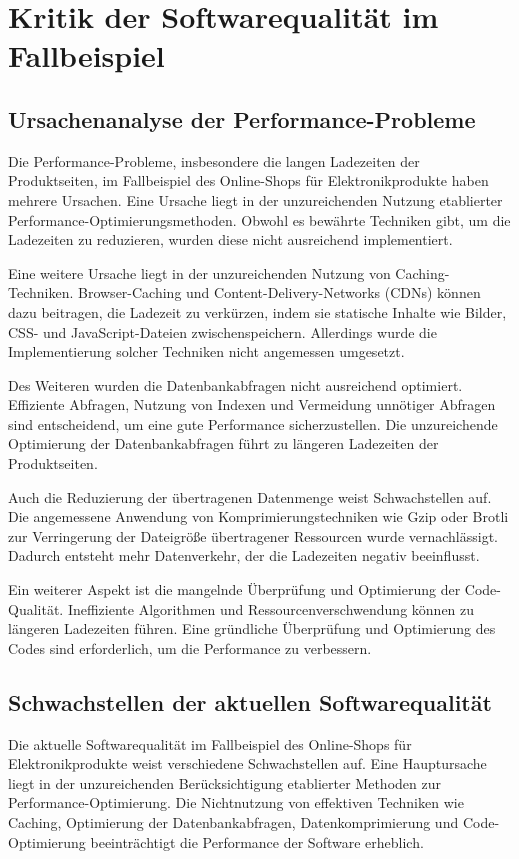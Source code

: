 \section{Kritik der Softwarequalität im Fallbeispiel}

\subsection{Ursachenanalyse der Performance-Probleme}
Die Performance-Probleme, insbesondere die langen Ladezeiten der Produktseiten, im Fallbeispiel des Online-Shops für Elektronikprodukte haben mehrere Ursachen. Eine Ursache liegt in der unzureichenden Nutzung etablierter Performance-Optimierungsmethoden. Obwohl es bewährte Techniken gibt, um die Ladezeiten zu reduzieren, wurden diese nicht ausreichend implementiert.

Eine weitere Ursache liegt in der unzureichenden Nutzung von Caching-Techniken. Browser-Caching und Content-Delivery-Networks (CDNs) können dazu beitragen, die Ladezeit zu verkürzen, indem sie statische Inhalte wie Bilder, CSS- und JavaScript-Dateien zwischenspeichern. Allerdings wurde die Implementierung solcher Techniken nicht angemessen umgesetzt.

Des Weiteren wurden die Datenbankabfragen nicht ausreichend optimiert. Effiziente Abfragen, Nutzung von Indexen und Vermeidung unnötiger Abfragen sind entscheidend, um eine gute Performance sicherzustellen. Die unzureichende Optimierung der Datenbankabfragen führt zu längeren Ladezeiten der Produktseiten.

Auch die Reduzierung der übertragenen Datenmenge weist Schwachstellen auf. Die angemessene Anwendung von Komprimierungstechniken wie Gzip oder Brotli zur Verringerung der Dateigröße übertragener Ressourcen wurde vernachlässigt. Dadurch entsteht mehr Datenverkehr, der die Ladezeiten negativ beeinflusst.

Ein weiterer Aspekt ist die mangelnde Überprüfung und Optimierung der Code-Qualität. Ineffiziente Algorithmen und Ressourcenverschwendung können zu längeren Ladezeiten führen. Eine gründliche Überprüfung und Optimierung des Codes sind erforderlich, um die Performance zu verbessern.

\subsection{Schwachstellen der aktuellen Softwarequalität}
Die aktuelle Softwarequalität im Fallbeispiel des Online-Shops für Elektronikprodukte weist verschiedene Schwachstellen auf. Eine Hauptursache liegt in der unzureichenden Berücksichtigung etablierter Methoden zur Performance-Optimierung. Die Nichtnutzung von effektiven Techniken wie Caching, Optimierung der Datenbankabfragen, Datenkomprimierung und Code-Optimierung beeinträchtigt die Performance der Software erheblich.

